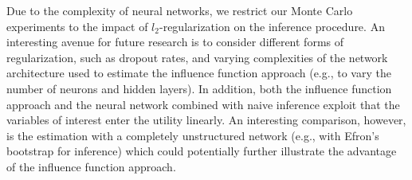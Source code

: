 \documentclass[a4paper, 12pt]{article}
\begin{document}
Due to the complexity of neural networks, we restrict our Monte Carlo experiments to the impact of $l_2$-regularization on the inference procedure. An interesting avenue for future research is to consider different forms of regularization, such as dropout rates, and varying complexities of the network architecture used to estimate the influence function approach (e.g.,  to vary the number of neurons and hidden layers). 
In addition, both the influence function approach and the neural network combined with naive inference exploit that the variables of interest enter the utility linearly. An interesting comparison, however, is the estimation with a completely unstructured network (e.g., with Efron's bootstrap for inference) which could potentially further illustrate the advantage of the influence function approach.


\newpage

\renewcommand\refname{References}

\end{document}

